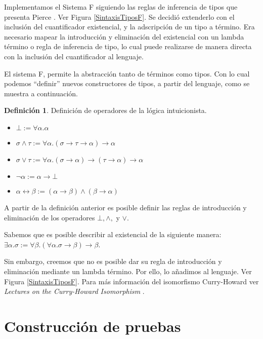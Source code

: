 \documentclass[a4paper,11pt]{article}
\theoremstyle{definition}
\newtheorem{definition}{Definición}
\theoremstyle{remark}
\begin{document}
Implementamos el Sistema F siguiendo las reglas de inferencia de tipos que presenta Pierce \cite{pierce}.
Ver Figura \ref{SintaxisTiposF}.
Se decidió extenderlo con el inclusión del cuantificador existencial, y la adscripción de un tipo a término.
Era necesario mapear la introducción y eliminación del existencial con un lambda término o regla de inferencia de tipo, 
lo cual puede realizarse de manera directa con la inclusión del cuantificador al lenguaje. 

El sistema F, permite la abstracción tanto de términos como tipos. Con lo cual podemos ``definir'' nuevos
constructores de tipos, a partir del lenguaje, como se muestra a continuación.

\begin{definition}
  Definición de operadores de la lógica intuicionista.

  \begin{itemize}
  \item $\bot := \forall \alpha. \alpha$
  \item $\sigma \wedge \tau := \forall \alpha. (\sigma \rightarrow \tau \rightarrow \alpha) \rightarrow \alpha$
  \item $\sigma \vee \tau := \forall \alpha. (\sigma \rightarrow \alpha) \rightarrow (\tau \rightarrow \alpha) \rightarrow \alpha$
  \item $\neg \alpha := \alpha \rightarrow \bot$
  \item $\alpha \leftrightarrow \beta := (\alpha \rightarrow \beta) \wedge (\beta \rightarrow \alpha)$ 
  \end{itemize}
\end{definition}

A partir de la definición anterior es posible definir las reglas de introducción y eliminación
de los operadores $\bot, \wedge,$ y $\vee$.

Sabemos que es posible describir al existencial de la siguiente manera:
$\exists \alpha. \sigma := \forall \beta. (\forall \alpha. \sigma \rightarrow \beta) \rightarrow \beta$.

Sin embargo, creemos que no es posible dar su regla de introducción y eliminación mediante un lambda término.
Por ello, lo añadimos al lenguaje. Ver Figura \ref{SintaxisTiposF}.
Para más información del isomorfismo Curry-Howard ver \textit{Lectures on the Curry-Howard Isomorphism} \cite{curry-howard}.

\section{Construcción de pruebas}
\label{construcciónDePruebas}
\end{document}
